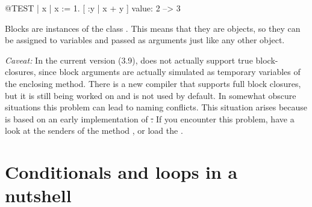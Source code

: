 \documentclass[a4paper,10pt,twoside]{book}
\begin{document}
\begin{code}{@TEST}
| x |
x := 1.
[ :y | x + y ] value: 2 --> 3
\end{code}

Blocks are instances of the class .
This means that they are objects, so they can be assigned to variables and passed as arguments just like any other object.

\emph{Caveat:}
In the current version (3.9), \sq does not actually support true block-closures, since block arguments are actually simulated as temporary variables of the enclosing method. There is a new compiler that supports full block closures, but it is still being worked on and is not used by default.
In somewhat obscure situations this problem can lead to naming conflicts.
This situation arises because \sq is based on an early implementation of \st.
If you encounter this problem, have a look at the senders of the method , or load the .






\section{Conditionals and loops in a nutshell}
\end{document}
